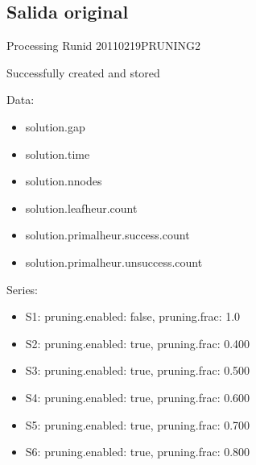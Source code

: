\documentclass[landscape, 12pt]{report}
\begin{document}
\subsection*{Salida original}	

Processing Runid 20110219PRUNING2

 Successfully created and stored

Data:
\begin{itemize}
\item solution.gap
\item solution.time
\item solution.nnodes
\item solution.leafheur.count
\item solution.primalheur.success.count
\item solution.primalheur.unsuccess.count
\end{itemize}
Series:
\begin{itemize}
\item S1: pruning.enabled: false, pruning.frac: 1.0
\item S2: pruning.enabled: true, pruning.frac: 0.400
\item S3: pruning.enabled: true, pruning.frac: 0.500
\item S4: pruning.enabled: true, pruning.frac: 0.600
\item S5: pruning.enabled: true, pruning.frac: 0.700
\item S6: pruning.enabled: true, pruning.frac: 0.800
\end{itemize}
\end{document}

